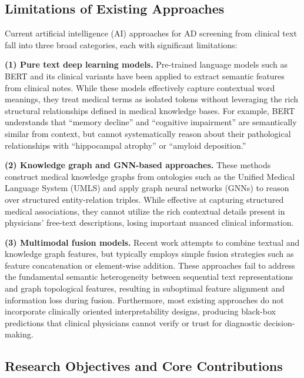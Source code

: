 \documentclass[11pt,onecolumn,a4paper]{article}
\begin{document}
\subsection{Limitations of Existing Approaches}

Current artificial intelligence (AI) approaches for AD screening from clinical text fall into three broad categories, each with significant limitations:

\textbf{(1) Pure text deep learning models.} Pre-trained language models such as BERT \cite{devlin2019bert} and its clinical variants \cite{alsentzer2019} have been applied to extract semantic features from clinical notes. While these models effectively capture contextual word meanings, they treat medical terms as isolated tokens without leveraging the rich structural relationships defined in medical knowledge bases. For example, BERT understands that ``memory decline'' and ``cognitive impairment'' are semantically similar from context, but cannot systematically reason about their pathological relationships with ``hippocampal atrophy'' or ``amyloid deposition.''

\textbf{(2) Knowledge graph and GNN-based approaches.} These methods construct medical knowledge graphs from ontologies such as the Unified Medical Language System (UMLS) \cite{bodenreider2004} and apply graph neural networks (GNNs) to reason over structured entity-relation triples. While effective at capturing structured medical associations, they cannot utilize the rich contextual details present in physicians' free-text descriptions, losing important nuanced clinical information.

\textbf{(3) Multimodal fusion models.} Recent work attempts to combine textual and knowledge graph features, but typically employs simple fusion strategies such as feature concatenation or element-wise addition. These approaches fail to address the fundamental semantic heterogeneity between sequential text representations and graph topological features, resulting in suboptimal feature alignment and information loss during fusion. Furthermore, most existing approaches do not incorporate clinically oriented interpretability designs, producing black-box predictions that clinical physicians cannot verify or trust for diagnostic decision-making.

\subsection{Research Objectives and Core Contributions}
\end{document}
